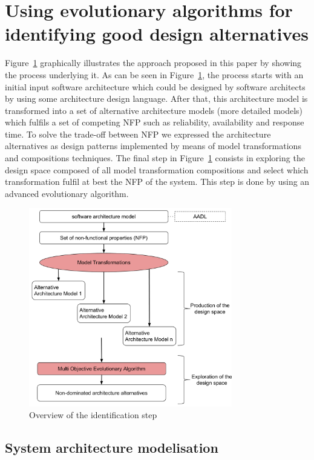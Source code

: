 \documentclass[conference]{IEEEtran}
\begin{document}
\section{Using evolutionary algorithms for identifying good design alternatives}
\label{Approach}
Figure~\ref{IS} graphically illustrates the approach proposed in this paper by showing the process underlying it. As can be seen in Figure~\ref{IS}, the process starts with an initial input software architecture which could be designed by software architects by using some architecture design language\cite{Medvidovic}. After that, this architecture model is transformed into a set of alternative architecture models (more detailed models) which fulfils a set of competing NFP such as reliability, availability and response time. To solve the trade-off between NFP we expressed the architecture alternatives as design patterns implemented by means of model transformations and compositions techniques. The final step in Figure~\ref{IS} consists in exploring the design space composed of all model transformation compositions and select which transformation fulfil at best the NFP of the system. This step is done by using an advanced evolutionary algorithm.

\begin{figure}[!t]
\centering
\includegraphics[width=3.49in]{IDMT.pdf}
\caption{Overview of the identification step}
\label{IS}
\end{figure}

\subsection{System architecture modelisation}
\end{document}
